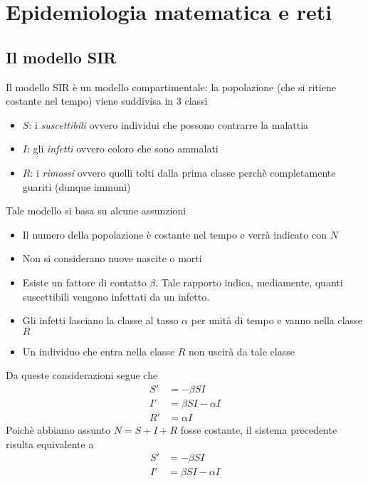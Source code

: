 \chapter{Epidemiologia matematica e reti}

\section{Il modello SIR}
Il modello SIR \`e un modello compartimentale: la popolazione (che si ritiene costante nel tempo) viene suddivisa in $3$ classi
\begin{itemize}
	\item $S$: i\textit{ suscettibili}  ovvero individui che possono contrarre la malattia
	\item $I$: gli \textit{ infetti} ovvero coloro che sono ammalati
	\item $R$: i \textit{ rimossi } ovvero quelli tolti dalla prima classe perch\`e completamente guariti (dunque immuni) 
	\end{itemize}
	Tale modello si basa su alcune assunzioni 
	\begin{itemize}
		\item Il numero della popolazione \`e costante nel tempo e verr\`a indicato con $N$ 
		\item Non si considerano nuove nascite o morti 

		\item Esiste un fattore di contatto  $\beta$. Tale rapporto indica, mediamente,  quanti suscettibili vengono infettati da un infetto.
		\item Gli infetti lasciano la classe al tasso $\alpha$ per unit\`a di tempo e vanno nella classe $R$
		\item Un individuo che entra nella classe $R$ non uscir\`a da tale classe
	\end{itemize}
Da queste considerazioni segue che 
\begin{equation}
\label{SIR}
\begin{aligned}
  S'&=-\beta S I \\
  I'&= \beta S I -\alpha I\\
  R'&=\alpha I 
\end{aligned}
\end{equation}
Poich\`e abbiamo assunto $N=S+I+R$ fosse costante, il sistema precedente risulta equivalente a 
\begin{equation}
\label{SI}
\begin{aligned}
  S'&=-\beta S I \\
  I'&= \beta S I -\alpha I
\end{aligned}
\end{equation}\\ 
